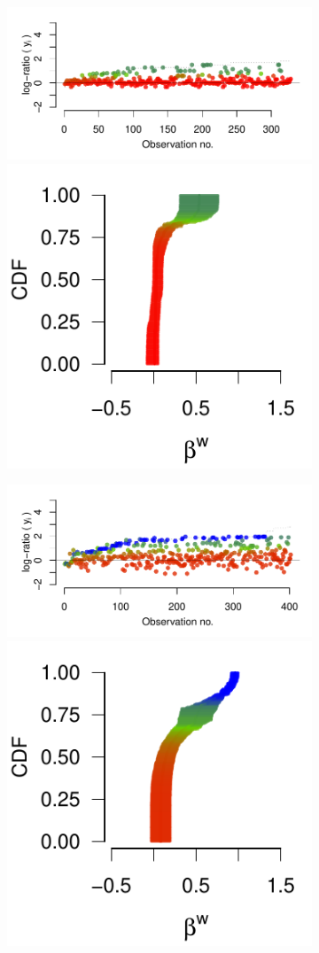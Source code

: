 \documentclass[9pt,a4paper,twocolumn,lineno]{article}
\begin{document}
\begin{figure}
\begin{subfigure}{.49\linewidth}
		{\includegraphics[width=.65\linewidth]{threads/thread_max_55_3}	\includegraphics[width=.33\linewidth]{betas/beta_max_55_3}}
		
		{\includegraphics[width=.65\linewidth]{threads/thread_max_148_3}	\includegraphics[width=.33\linewidth]{betas/beta_max_148_3}}
		

\end{subfigure}
\end{figure}
\end{document}
